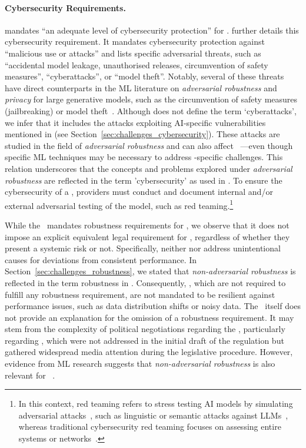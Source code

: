 \paragraph{Cybersecurity Requirements.} 
%
 mandates ``an adequate level of cybersecurity protection'' for \GPAIMSSR.
%
 further details this cybersecurity requirement.
% 
It mandates cybersecurity protection against ``malicious use or attacks'' and lists specific adversarial threats, such as ``accidental model leakage, unauthorised releases, circumvention of safety
measures'', ``cyberattacks'',
or ``model theft''. 
%
Notably, several of these threats have direct counterparts in the ML literature on \emph{adversarial robustness} and \emph{privacy} for large generative models, such as the circumvention of safety measures (jailbreaking) or model theft~\cite{yao2024survey, li2023multi, wang2023survey}.
%
Although  does not define the term `cyberattacks', we infer that it includes the attacks exploiting AI-specific vulnerabilities mentioned in  (see Section~\ref{sec:challenges_cybersecurity}). These attacks are studied in the field of \emph{adversarial robustness} and 
can also affect \GPAIMS~\cite{qiang2024learning, das2024exposing, yan2024backdooring, schwinn2024soft, vitorino2024adversarial}---even though specific ML techniques may be necessary to address \GPAIM-specific challenges. 
% 
This relation underscores that the concepts and problems explored under \emph{adversarial robustness} are reflected in the term 'cybersecurity' as used in .
%
To ensure the cybersecurity of a \GPAIMSSR, providers must conduct and document internal and/or external adversarial testing of the model, such as red teaming.\footnote{In this context, red teaming refers to stress testing AI models by simulating adversarial attacks~\cite{feffer2024red}, such as linguistic or semantic attacks against LLMs~\cite{shi2024red}, whereas traditional cybersecurity red teaming focuses on assessing entire systems or networks~\cite{teichmann2023overview}.}

While the \EUAIAct\ mandates robustness requirements for \HRAIS, we observe that it does not impose an explicit equivalent legal requirement for \GPAIMS, regardless of whether they present a systemic risk or not.
%
Specifically, neither  nor  address unintentional causes for deviations from consistent performance. 
%
In Section~\ref{sec:challenges_robustness}, we stated that \emph{non-adversarial robustness} is reflected in the term robustness in . 
%
Consequently, \GPAIMS, which are not required to fulfill any robustness requirement, are not mandated to be resilient against performance issues, such as data distribution shifts or noisy data.
% 
The \EUAIAct\ itself does not provide an explanation for the omission of a robustness requirement.
%
It may stem from the complexity of political negotiations regarding the \EUAIAct, particularly regarding \GPAIMS, which were not addressed in the initial draft of the regulation but gathered widespread media attention during the legislative procedure.
%
However, evidence from ML research suggests that \emph{non-adversarial robustness} is also relevant for \GPAIMS~\cite{yuan2023revisiting, chen2022foundational}.
% 



